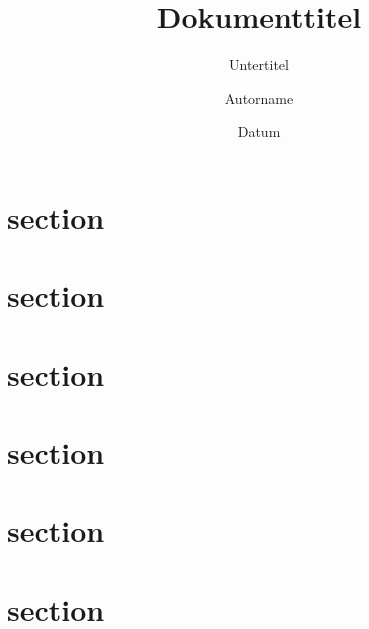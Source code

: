 \documentclass[ngerman]{scrartcl}
\title[Kurzform]{Dokumenttitel}
\subtitle{Untertitel}
\date{Datum}
\author{Autorname}
\begin{document}
 \maketitle


 \section{section}
 \lipsum[1-5]

 \section{section}
 \lipsum[1-5]

 \section{section}
 \lipsum[1-5]

 \section{section}
 \lipsum[1-5]

 \section{section}
 \lipsum[1-5]

 \section{section}
 \lipsum[1-25]
\end{document}
